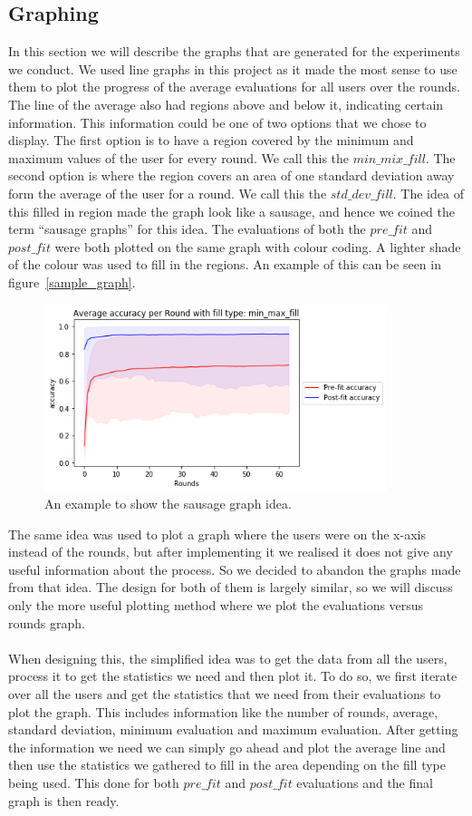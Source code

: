 \documentclass[12pt]{article}
\begin{document}
\subsection{Graphing}
In this section we will describe the graphs that are generated for the experiments we conduct. We used line graphs in this project as it made the most sense to use them to plot the progress of the average evaluations for all users over the rounds. The line of the average also had regions above and below it, indicating certain information. This information could be one of two options that we chose to display. The first option is to have a region covered by the minimum and maximum values of the user for every round. We call this the $min\_mix\_fill$. The second option is where the region covers an area of one standard deviation away form the average of the user for a round. We call this the $std\_dev\_fill$. The idea of this filled in region made the graph look like a sausage, and hence we coined the term ``sausage graphs'' for this idea. The evaluations of both the $pre\_fit$ and $post\_fit$ were both plotted on the same graph with colour coding. A lighter shade of the colour was used to fill in the regions. An example of this can be seen in figure~\ref{sample_graph}.
\begin{figure}[H]
	\centering
	\includegraphics[width=10cm]{resources/sample_graph.png}
	\caption{An example to show the sausage graph idea.}
	\label{fig:sample_graph}
\end{figure}
\noindent The same idea was used to plot a graph where the users were on the x-axis instead of the rounds, but after implementing it we realised it does not give any useful information about the process. So we decided to abandon the graphs made from that idea. The design for both of them is largely similar, so we will discuss only the more useful plotting method where we plot the evaluations versus rounds graph. 
\\\\
When designing this, the simplified idea was to get the data from all the users, process it to get the statistics we need and then plot it. To do so, we first iterate over all the users and get the statistics that we need from their evaluations to plot the graph. This includes information like the number of rounds, average, standard deviation, minimum evaluation and maximum evaluation. After getting the information we need we can simply go ahead and plot the average line and then use the statistics we gathered to fill in the area depending on the fill type being used. This done for both $pre\_fit$ and $post\_fit$ evaluations and the final graph is then ready. 
\end{document}
